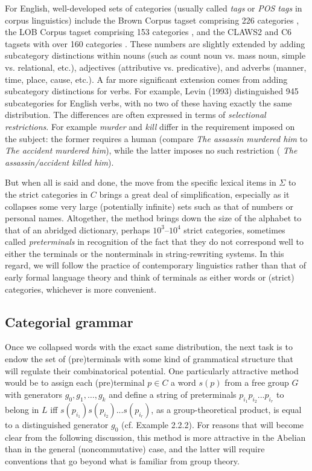 For English, well-developed sets of categories (usually called {\it tags} or
{\it POS tags} in   corpus linguistics) include
the Brown Corpus tagset comprising 226 categories \cite{Greene:1971}, the LOB
Corpus tagset comprising 153 categories \cite{Johansson:1986}, and the CLAWS2
and C6 tagsets with over 160 categories \cite{Leech:1994}. These numbers are
slightly extended by adding subcategory distinctions within nouns (such as
count noun vs. mass noun, simple vs.  relational, etc.), adjectives
(attributive vs. predicative), and adverbs (manner, time, place, cause,
etc.). A far more significant extension comes from adding subcategory
distinctions for verbs. For example, Levin (1993) distinguished 945
subcategories for English verbs, with no two of these having exactly the same
distribution. The differences are often expressed in terms of {\it selectional
  restrictions}. For example {\it murder} and
{\it kill} differ in the requirement imposed on the subject: the former
requires a human (compare {\it The assassin murdered him} to {\it *The
  accident murdered him}), while the latter imposes no such restriction ({\it
  The assassin/accident killed him}). 

But when all is said and done, the move from the specific lexical items in
$\Sigma$ to the strict categories in $C$ brings a great deal of
simplification, especially as it collapses some very large (potentially
infinite) sets such as that of numbers or personal names. Altogether, the
method brings down the size of the alphabet to that of an abridged dictionary,
perhaps $10^3$--$10^4$ strict categories, sometimes called {\it preterminals}
 in recognition of the fact that they do not correspond
well to either the terminals or the nonterminals in string-rewriting systems.
In this regard, we will follow the practice of contemporary linguistics rather
than that of early formal language theory and think of terminals as either
words or (strict) categories, whichever is more convenient. 

\subsection{Categorial grammar}

Once we collapsed words with the exact same distribution, the next task is to
endow the set of (pre)terminals with some kind of grammatical structure that
will regulate their combinatorical potential. One particularly attractive
method would be to assign each (pre)terminal $p \in C $ a word $s(p)$ from a
free group $G$ with generators $g_0, g_1, \ldots , g_k$ and define a string of
preterminals $p_{i_1}p_{i_2}...p_{i_r}$ to belong in $L$ iff
$s(p_{i_1})s(p_{i_2})...s(p_{i_r})$, as a group-theoretical product, is equal
to a distinguished generator $g_0$ (cf. Example 2.2.2). For reasons that will
become clear from the following discussion, this method is more attractive in
the Abelian than in the general (noncommutative) case, and the latter will
require conventions that go beyond what is familiar from group theory. 


